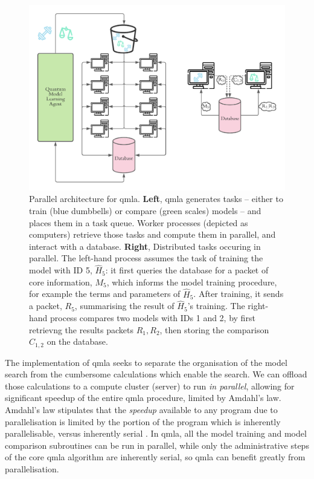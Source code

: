 \begin{figure}
    \includegraphics{algorithms/figures/parallel_architecture.pdf}
    \caption[Parallel architecture for QMLA]{
        Parallel architecture for \acrfull{qmla}.
        \textbf{Left}, \gls{qmla} generates tasks 
            -- either to train (blue dumbbells) or compare (green scales) models -- 
            and places them in a task queue. 
        Worker processes (depicted as computers) retrieve those tasks and compute them in parallel, 
            and interact with a database. 
        \textbf{Right}, Distributed tasks occuring in parallel. 
        The left-hand process assumes the task of training the model with ID 5, $\hat{H}_5$:
            it first queries the database for a packet of core information, $M_5$, 
            which informs the model training procedure, for example the terms and parameters 
            of $\hat{H}_5$. 
        After training, it sends a packet, $R_5$, summarising the result of $\hat{H}_5$'s training. 
        The right-hand process compares two models with IDs 1 and 2, by first retrievng the results packets
            $R_1, R_2$, then storing the comparison $C_{1,2}$ on the database. 
    }
    \label{fig:parallel}
\end{figure}

The implementation of \gls{qmla} seeks to separate the organisation of the  \gls{model search}  from the 
    cumbersome calculations which enable the search. 
We can offload those calculations to a compute cluster (server) to run \emph{in parallel},
    allowing for significant speedup of the entire \gls{qmla} procedure, 
    limited by Amdahl's law. 
Amdahl's law stipulates that the \emph{speedup} available to any program due to parallelisation 
    is limited by the portion of the program which is inherently parallelisable, versus inherently serial \cite{hill2008amdahl}.
In \gls{qmla}, all the model training and model comparison subroutines can be run in parallel, 
    while only the administrative steps of the core \gls{qmla} algorithm are inherently serial, 
    so \gls{qmla} can benefit greatly from parallelisation.
\par

